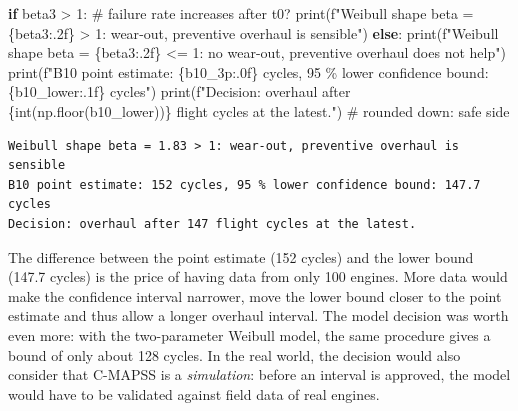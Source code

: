 \documentclass[
  letterpaper,
  DIV=11,
  numbers=noendperiod]{scrreprt}
\newenvironment{Shaded}{\begin{snugshade}}{\end{snugshade}}
\newcommand{\BuiltInTok}[1]{\textcolor[rgb]{0.00,0.23,0.31}{#1}}
\newcommand{\CommentTok}[1]{\textcolor[rgb]{0.37,0.37,0.37}{#1}}
\newcommand{\ControlFlowTok}[1]{\textcolor[rgb]{0.00,0.23,0.31}{\textbf{#1}}}
\newcommand{\DecValTok}[1]{\textcolor[rgb]{0.68,0.00,0.00}{#1}}
\newcommand{\NormalTok}[1]{\textcolor[rgb]{0.00,0.23,0.31}{#1}}
\newcommand{\OperatorTok}[1]{\textcolor[rgb]{0.37,0.37,0.37}{#1}}
\newcommand{\SpecialCharTok}[1]{\textcolor[rgb]{0.37,0.37,0.37}{#1}}
\newcommand{\SpecialStringTok}[1]{\textcolor[rgb]{0.13,0.47,0.30}{#1}}
\begin{document}
\begin{Shaded}
\begin{Highlighting}[]
\ControlFlowTok{if}\NormalTok{ beta3 }\OperatorTok{\textgreater{}} \DecValTok{1}\NormalTok{:                                      }\CommentTok{\# failure rate increases after t0?}
    \BuiltInTok{print}\NormalTok{(}\SpecialStringTok{f"Weibull shape beta = }\SpecialCharTok{\{}\NormalTok{beta3}\SpecialCharTok{:.2f\}}\SpecialStringTok{ \textgreater{} 1: wear{-}out, preventive overhaul is sensible"}\NormalTok{)}
\ControlFlowTok{else}\NormalTok{:}
    \BuiltInTok{print}\NormalTok{(}\SpecialStringTok{f"Weibull shape beta = }\SpecialCharTok{\{}\NormalTok{beta3}\SpecialCharTok{:.2f\}}\SpecialStringTok{ \textless{}= 1: no wear{-}out, preventive overhaul does not help"}\NormalTok{)}
\BuiltInTok{print}\NormalTok{(}\SpecialStringTok{f"B10 point estimate: }\SpecialCharTok{\{}\NormalTok{b10\_3p}\SpecialCharTok{:.0f\}}\SpecialStringTok{ cycles, 95 \% lower confidence bound: }\SpecialCharTok{\{}\NormalTok{b10\_lower}\SpecialCharTok{:.1f\}}\SpecialStringTok{ cycles"}\NormalTok{)}
\BuiltInTok{print}\NormalTok{(}\SpecialStringTok{f"Decision: overhaul after }\SpecialCharTok{\{}\BuiltInTok{int}\NormalTok{(np.floor(b10\_lower))}\SpecialCharTok{\}}\SpecialStringTok{ flight cycles at the latest."}\NormalTok{)  }\CommentTok{\# rounded down: safe side}
\end{Highlighting}
\end{Shaded}

\begin{verbatim}
Weibull shape beta = 1.83 > 1: wear-out, preventive overhaul is sensible
B10 point estimate: 152 cycles, 95 % lower confidence bound: 147.7 cycles
Decision: overhaul after 147 flight cycles at the latest.
\end{verbatim}

The difference between the point estimate (152 cycles) and the lower
bound (147.7 cycles) is the price of having data from only 100 engines.
More data would make the confidence interval narrower, move the lower
bound closer to the point estimate and thus allow a longer overhaul
interval. The model decision was worth even more: with the two-parameter
Weibull model, the same procedure gives a bound of only about 128
cycles. In the real world, the decision would also consider that C-MAPSS
is a \emph{simulation}: before an interval is approved, the model would
have to be validated against field data of real engines.
\end{document}
